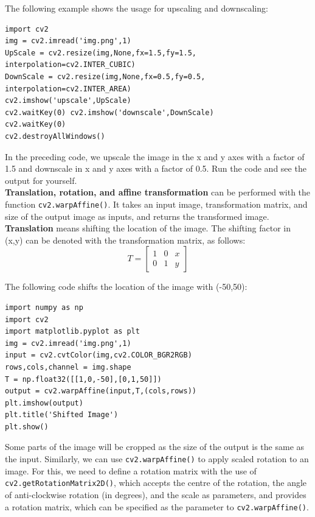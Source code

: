 \documentclass{labo}
\begin{document}
The following example shows the usage for upscaling and downscaling:

\begin{verbatim}
import cv2
img = cv2.imread('img.png',1)
UpScale = cv2.resize(img,None,fx=1.5,fy=1.5, interpolation=cv2.INTER_CUBIC) 
DownScale = cv2.resize(img,None,fx=0.5,fy=0.5, interpolation=cv2.INTER_AREA) 
cv2.imshow('upscale',UpScale) 
cv2.waitKey(0) cv2.imshow('downscale',DownScale)
cv2.waitKey(0) 
cv2.destroyAllWindows()
\end{verbatim}

In the preceding code, we upscale the image in the x and y axes with a factor of 1.5 and downscale in x and y axes with a factor of 0.5. Run the code and see the output for yourself.\\

\textbf{Translation, rotation, and affine transformation} can be performed with the function \texttt{cv2.warpAffine()}. It takes an input image, transformation matrix, and size of the output image as inputs, and returns the transformed image.\\

\textbf{Translation} means shifting the location of the image. The shifting factor in (x,y) can be denoted with the transformation matrix, as follows:
\[ T = 
\begin{bmatrix}
1 & 0 & x\\
0 & 1 & y
\end{bmatrix}
\]

The following code shifts the location of the image with (-50,50):

\begin{verbatim}
import numpy as np 
import cv2 
import matplotlib.pyplot as plt 
img = cv2.imread('img.png',1) 
input = cv2.cvtColor(img,cv2.COLOR_BGR2RGB) 
rows,cols,channel = img.shape 
T = np.float32([[1,0,-50],[0,1,50]]) 
output = cv2.warpAffine(input,T,(cols,rows)) 
plt.imshow(output)
plt.title('Shifted Image') 
plt.show()
\end{verbatim}

Some parts of the image will be cropped as the size of the output is the same as the input. Similarly, we can use \texttt{cv2.warpAffine()} to apply scaled rotation to an image. For this, we need to define a rotation matrix with the use of \texttt{cv2.getRotationMatrix2D()}, which accepts the centre of the rotation, the angle of anti-clockwise rotation (in degrees), and the scale as parameters, and provides a rotation matrix, which can be specified as the parameter to \texttt{cv2.warpAffine()}. \\
\end{document}
